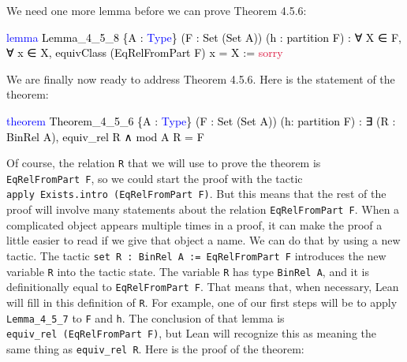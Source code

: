 \documentclass[
  letterpaper,
  DIV=11,
  numbers=noendperiod]{scrreprt}
\newenvironment{Shaded}{\begin{snugshade}}{\end{snugshade}}
\newcommand{\ConstantTok}[1]{\textcolor[rgb]{0.56,0.35,0.01}{#1}}
\newcommand{\KeywordTok}[1]{\textcolor[rgb]{0.00,0.23,0.31}{#1}}
\newcommand{\NormalTok}[1]{\textcolor[rgb]{0.00,0.23,0.31}{#1}}
\renewcommand{\NormalTok}[1]{\textcolor[HTML]{000000}{#1}}
\renewcommand{\KeywordTok}[1]{\textcolor[HTML]{0000FF}{#1}}
\renewcommand{\ConstantTok}[1]{\textcolor[HTML]{DC143C}{#1}}
\theoremstyle{remark}
\begin{document}
We need one more lemma before we can prove Theorem 4.5.6:

\begin{Shaded}
\begin{Highlighting}[]
\KeywordTok{lemma}\NormalTok{ Lemma\_4\_5\_8 \{A : }\KeywordTok{Type}\NormalTok{\} (F : Set (Set A)) (h : partition F) :}
\NormalTok{    ∀ X ∈ F, ∀ x ∈ X, equivClass (EqRelFromPart F) x = X := }\ConstantTok{sorry}
\end{Highlighting}
\end{Shaded}

We are finally now ready to address Theorem 4.5.6. Here is the statement
of the theorem:

\begin{Shaded}
\begin{Highlighting}[]
\KeywordTok{theorem}\NormalTok{ Theorem\_4\_5\_6 \{A : }\KeywordTok{Type}\NormalTok{\} (F : Set (Set A)) (h: partition F) :}
\NormalTok{    ∃ (R : BinRel A), equiv\_rel R ∧ mod A R = F}
\end{Highlighting}
\end{Shaded}

Of course, the relation \texttt{R} that we will use to prove the theorem
is \texttt{EqRelFromPart\ F}, so we could start the proof with the
tactic \texttt{apply\ Exists.intro\ (EqRelFromPart\ F)}. But this means
that the rest of the proof will involve many statements about the
relation \texttt{EqRelFromPart\ F}. When a complicated object appears
multiple times in a proof, it can make the proof a little easier to read
if we give that object a name. We can do that by using a new tactic. The
tactic \texttt{set\ R\ :\ BinRel\ A\ :=\ EqRelFromPart\ F} introduces
the new variable \texttt{R} into the tactic state. The variable
\texttt{R} has type \texttt{BinRel\ A}, and it is definitionally equal
to \texttt{EqRelFromPart\ F}. That means that, when necessary, Lean will
fill in this definition of \texttt{R}. For example, one of our first
steps will be to apply \texttt{Lemma\_4\_5\_7} to \texttt{F} and
\texttt{h}. The conclusion of that lemma is
\texttt{equiv\_rel\ (EqRelFromPart\ F)}, but Lean will recognize this as
meaning the same thing as \texttt{equiv\_rel\ R}. Here is the proof of
the theorem:
\end{document}

